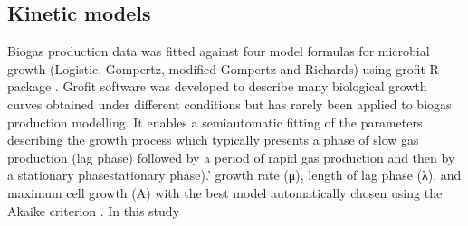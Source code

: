 \subsection{Kinetic models}
Biogas production data was fitted against four model formulas for microbial growth (Logistic, Gompertz, modified Gompertz and Richards) using grofit R package \cite{Kahm_2010}. Grofit software was developed to describe many biological growth curves obtained under different conditions but has rarely been applied to biogas production modelling. It enables a semiautomatic fitting of the parameters describing the growth process which typically presents a phase of slow gas production (lag phase) followed by a period of rapid gas production and then by a stationary phasestationary phase).’ growth rate (μ), length of lag phase (λ), and maximum cell growth (A) with the best model automatically chosen using the Akaike criterion \cite{Hasenbrink_2006}. In this study